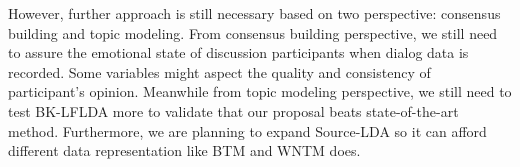 \documentclass[senior]{IPSstyle}
\begin{document}
However, further approach is still necessary based on two perspective: consensus building and topic modeling. From consensus building perspective, we still need to assure the emotional state of discussion participants when dialog data is recorded. Some variables might aspect the quality and consistency of participant’s opinion. Meanwhile from topic modeling perspective, we still need to test BK-LFLDA more to validate that our proposal beats state-of-the-art method. Furthermore, we are planning to expand Source-LDA so it can afford different data representation like BTM and WNTM does.



\end{document}
